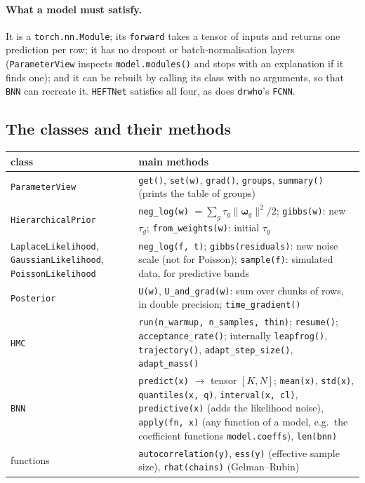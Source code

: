 \documentclass[11pt]{article}
\newcommand{\code}[1]{\texttt{#1}}
\newcommand{\bw}{\boldsymbol{\omega}}
\begin{document}
\paragraph{What a model must satisfy.} It is a \code{torch.nn.Module}; its
\code{forward} takes a tensor of inputs and returns one prediction per row; it has no
dropout or batch-normalisation layers (\code{ParameterView} inspects
\code{model.modules()} and stops with an explanation if it finds one); and it can be
rebuilt by calling its class with no arguments, so that \code{BNN} can recreate it.
\code{HEFTNet} satisfies all four, as does \code{drwho}'s \code{FCNN}.

\subsection{The classes and their methods}

\begin{center}
\small
\begin{tabular}{p{}p{}}
\toprule
class & main methods\\
\midrule
\code{ParameterView} & \code{get()}, \code{set(w)}, \code{grad()}, \code{groups},
  \code{summary()} (prints the table of groups)\\
\code{HierarchicalPrior} & \code{neg\_log(w)} $= \sum_g \tau_g\lVert\bw_g\rVert^2/2$;
  \code{gibbs(w)}: new $\tau_g$; \code{from\_weights(w)}: initial $\tau_g$\\
\code{LaplaceLikelihood}, \code{GaussianLikelihood}, \code{PoissonLikelihood} &
  \code{neg\_log(f, t)}; \code{gibbs(residuals)}: new noise scale (not for Poisson);
  \code{sample(f)}: simulated data, for predictive bands\\
\code{Posterior} & \code{U(w)}, \code{U\_and\_grad(w)}: sum over chunks of rows, in
  double precision; \code{time\_gradient()}\\
\code{HMC} & \code{run(n\_warmup, n\_samples, thin)}; \code{resume()};
  \code{acceptance\_rate()}; internally \code{leapfrog()}, \code{trajectory()},
  \code{adapt\_step\_size()}, \code{adapt\_mass()}\\
\code{BNN} & \code{predict(x)} $\to$ tensor $[K, N]$; \code{mean(x)}, \code{std(x)},
  \code{quantiles(x, q)}, \code{interval(x, cl)}, \code{predictive(x)} (adds the
  likelihood noise), \code{apply(fn, x)} (any function of a model, e.g.\ the
  coefficient functions \code{model.coeffs}), \code{len(bnn)}\\
functions & \code{autocorrelation(y)}, \code{ess(y)} (effective sample size),
  \code{rhat(chains)} (Gelman--Rubin)\\
\bottomrule
\end{tabular}
\end{center}
\end{document}
